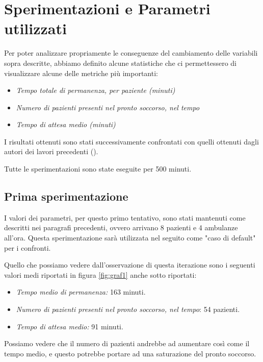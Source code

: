 \section{Sperimentazioni e Parametri utilizzati} \label{par:esp}

Per poter analizzare propriamente le conseguenze del cambiamento delle variabili sopra descritte, abbiamo definito alcune statistiche che ci permettessero di visualizzare alcune delle metriche più importanti:

\begin{itemize}
    \item \textit{Tempo totale di permanenza, per paziente (minuti)}
    \item \textit{Numero di pazienti presenti nel pronto soccorso, nel tempo}
    \item \textit{Tempo di attesa medio (minuti)}
\end{itemize}

I risultati ottenuti sono stati successivamente confrontati con quelli ottenuti dagli autori dei lavori precedenti (\textit{\cite{espinoza_real-time_2014}}).

Tutte le sperimentazioni sono state eseguite per 500 minuti.

\subsection{Prima sperimentazione} 
I valori dei parametri, per questo primo tentativo, sono stati mantenuti come descritti nei paragrafi precedenti, ovvero arrivano 8 pazienti e 4 ambulanze all'ora. 
Questa sperimentazione sarà utilizzata nel seguito come "caso di default" per i confronti.


Quello che possiamo vedere dall'osservazione di questa iterazione sono i seguenti valori medi riportati in figura \ref{fig:graf1} anche sotto riportati:
\begin{itemize}
    \item \textit{Tempo medio di permanenza:} 163 minuti.
    \item \textit{Numero di pazienti presenti nel pronto soccorso, nel tempo}: 54 pazienti.
    \item \textit{Tempo di attesa medio:} 91 minuti.
\end{itemize}


Possiamo vedere che il numero di pazienti andrebbe ad aumentare così come il tempo medio, e questo potrebbe portare ad una saturazione del pronto soccorso.

